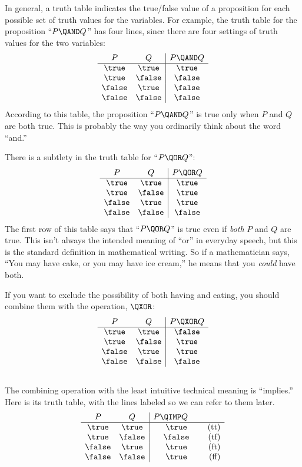 In general, a truth table indicates the true/false value of a proposition
for each possible set of truth values for the variables.  For example, the
truth table for the proposition ``$P \QAND Q$'' has four lines, since
there are four settings of truth values for the two variables:
%
\[
\begin{array}{cc|c}
P & Q & P \QAND Q \\ \hline
\true & \true & \true \\
\true & \false & \false \\
\false & \true & \false \\
\false & \false & \false
\end{array}
\]
%
According to this table, the proposition ``$P \QAND Q$'' is true only when
$P$ and $Q$ are both true.  This is probably the way you ordinarily think
about the word ``and.''

There is a subtlety in the truth table for ``$P \QOR Q$'':
%
\[
\begin{array}{cc|c}
P & Q & P \QOR Q \\ \hline
\true & \true & \true \\
\true & \false & \true \\
\false & \true & \true \\
\false & \false & \false
\end{array}
\]
%
The first row of this table says that ``$P \QOR Q$'' is true even if
\textit{both} $P$ and $Q$ are true.  This isn't always the intended
meaning of ``or'' in everyday speech, but this is the standard definition
in mathematical writing.  So if a mathematician says, ``You may have cake,
or you may have ice cream,'' he means that you \textit{could} have both.

If you want to exclude the possibility of both having and eating, you
should combine them with the  operation, $\QXOR$:
%
\[\begin{array}{cc|c}
P & Q & P \QXOR Q \\ \hline
\true & \true & \false \\
\true & \false & \true \\
\false & \true & \true \\
\false & \false & \false
\end{array}
\]

\subsection{\QIMPLIES}

The combining operation with the least intuitive technical meaning is
``implies.''  Here is its truth table, with the lines labeled so we can
refer to them later.
%
\[
\begin{array}{cc|cr}
    P  &   Q    & \parbox[b]{13ex}{$P \QIMP Q$} \\ \hline
\true  & \true  & \true & \text{(tt)}\\
\true  & \false & \false  & \text{(tf)}\\
\false & \true  & \true  & \text{(ft)}\\
\false & \false & \true  & \text{(ff)}
\end{array}
\]

